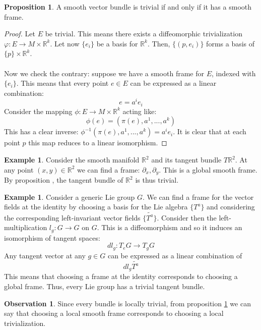 \documentclass[12pt,a4paper]{report}
\theoremstyle{definition}
\theoremstyle{Theorem}
\newtheorem{Prop}[Def]{Proposition}
\theoremstyle{definition}
\newtheorem{Ex}[Def]{Example}
\theoremstyle{definition}
\newtheorem{Obs}[Def]{Observation}
\begin{document}
	\begin{Prop}\label{Prop_2.3.1}
		A smooth vector bundle is trivial if and only if it has a smooth frame.
	\end{Prop}
	\begin{proof}
		Let $E$ be trivial. This means there exists a diffeomorphic trivialization $\varphi:E\rightarrow M\times \mathbb{R}^k$. Let now $\{e_i\}$ be a basis for $\mathbb{R}^k$. Then, $\{(p,e_i)\}$ forms a basis of $\{p\}\times \mathbb{R}^k$.
		\\\\
		Now we check the contrary: suppose we have a smooth frame for $E$, indexed with $\{e_i\}$. This means that every point $e\in E$ can be expressed as a linear combination:
		$$e=a^ie_i$$
		Consider the mapping $\phi:E\rightarrow M\times\mathbb{R}^k$ acting like:
		$$\phi(e)=(\pi(e),a^1,...,a^k)$$
		This has a clear inverse: $\phi^{-1}(\pi(e),a^1,...,a^k)=a^ie_i$.
		It is clear that at each point $p$ this map reduces to a linear isomorphism.
	\end{proof}
	\begin{Ex}
		Consider the smooth manifold $\mathbb{R}^2$ and its tangent bundle $T\mathbb{R}^2$. At any point $(x,y)\in\mathbb{R}^2$ we can find a frame: $\partial_x,\partial_y$. This is a global smooth frame. By proposition $\label{prop_2.3.1}$, the tangent bundle of $\mathbb{R}^2$ is thus trivial.
	\end{Ex}
	\begin{Ex}
		Consider a generic Lie group $G$. We can find a frame for the vector fields at the identity by choosing a basis for the Lie algebra $\{T^a\}$ and considering the corresponding left-invariant vector fields $\{\tilde{T^a}\}$. Consider then the left-multiplication $l_g:G\rightarrow G$ on $G$. This is a diffeomorphism and so it induces an isomorphism of tangent spaces:
		$$dl_g:T_eG\rightarrow T_gG$$
		Any tangent vector at any $g\in G$ can be expressed as a linear combination of
		$$dl_g\tilde{T^a}$$
		This means that choosing a frame at the identity corresponds to choosing a global frame. Thus, every Lie group has a trivial tangent bundle. 
	\end{Ex}
	\begin{Obs}
		Since every bundle is locally trivial, from proposition \ref{Prop_2.3.1} we can say that choosing a local smooth frame corresponds to choosing a local trivialization.
	\end{Obs}
\end{document}
